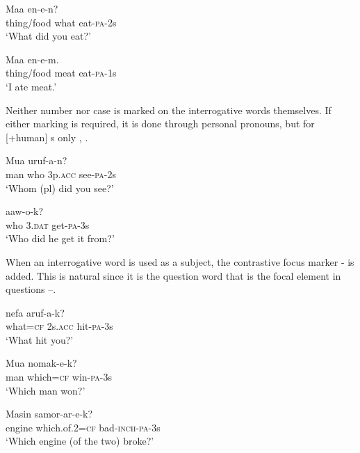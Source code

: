 \ea%
\label{ex:3:x521}
\gll Maa  en-e-n? \\
thing/food what eat-\textsc{pa}-2s\\
\glt`What did you eat?'
\z

\ea%
\label{ex:3:x648}
\gll Maa  en-e-m. \\
thing/food meat eat-\textsc{pa}-1s\\
\glt`I ate meat.'
\z

Neither number nor case is marked on the interrogative words themselves. If either marking is required, it is done through personal pronouns, but for [+human] s only , .

\ea%
\label{ex:3:x522}
\gll Mua   uruf-a-n? \\
man who 3p.\textsc{acc} see-\textsc{pa}-2s\\
\glt`Whom (pl) did you see?'
\z

\ea%
\label{ex:3:x523}
\gll {}  aaw-o-k? \\
who 3.\textsc{dat} get-\textsc{pa}-3s\\
\glt`Who did he get it from?'
\z

When an interrogative word is used as a subject, the contrastive focus marker \nobreakdash- is added. This is natural since it is the question word that is the focal element in questions --. 

\ea%
\label{ex:3:x524}
\gll {} nefa aruf-a-k? \\
what=\textsc{cf} 2s.\textsc{acc} hit-\textsc{pa}-3s\\
\glt`What hit you?'
\z

\ea%
\label{ex:3:x525}
\gll Mua  nomak-e-k? \\
man which=\textsc{cf} win-\textsc{pa}-3s\\
\glt`Which man won?'
\z

\ea%
\label{ex:3:x526}
\gll Masin  samor-ar-e-k? \\
engine which.of.2=\textsc{cf} bad-\textsc{inch}-\textsc{pa}-3s\\
\glt`Which engine (of the two) broke?'
\z

